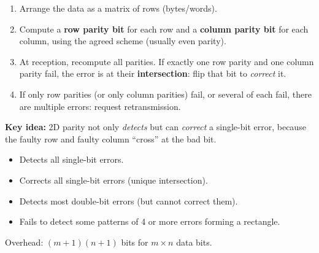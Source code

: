 \documentclass[11pt]{article}
\newcommand{\cle}[1]{{\popxbold\color{popdark}#1}}
\begin{document}
\begin{methode}
\begin{enumerate}
\item Arrange the data as a \cle{matrix} of rows (bytes/words).
\item Compute a \textbf{row parity bit} for each row and a \textbf{column parity bit} for each column, using the agreed scheme (usually even parity).
\item At reception, recompute all parities. If exactly one row parity and one column parity fail, the error is at their \textbf{intersection}: flip that bit to \emph{correct} it.
\item If only row parities (or only column parities) fail, or several of each fail, there are multiple errors: request retransmission.
\end{enumerate}
\textbf{Key idea:} 2D parity not only \emph{detects} but can \emph{correct} a single-bit error, because the faulty row and faulty column ``cross'' at the bad bit.
\end{methode}

\begin{aretenir}
\begin{itemize}
\item Detects all single-bit errors.
\item Corrects all single-bit errors (unique intersection).
\item Detects most double-bit errors (but cannot correct them).
\item Fails to detect some patterns of 4 or more errors forming a rectangle.
\end{itemize}
Overhead: $(m+1)(n+1)$ bits for $m\times n$ data bits.
\end{aretenir}
\end{document}
